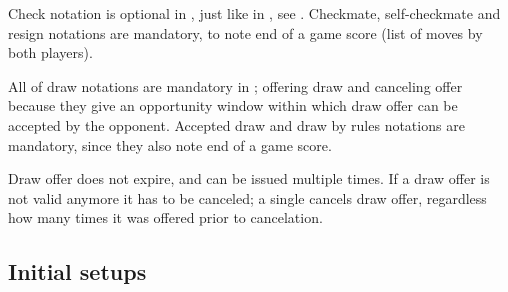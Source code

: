 Check notation is optional in , just like in , see
. Checkmate, self-checkmate and resign notations are mandatory,
to note end of a game score (list of moves by both players).

All of draw notations are mandatory in ; offering draw and canceling
offer because they give an opportunity window within which draw offer can be
accepted by the opponent. Accepted draw and draw by rules notations are mandatory,
since they also note end of a game score.

Draw offer does not expire, and can be issued multiple times. If a draw offer is
not valid anymore it has to be canceled; a single \alg{()} cancels draw offer,
regardless how many times it was offered prior to cancelation.

\clearpage %

\subsection*{Initial setups}
\label{sec:Appendix/Summary/Initial setups}

